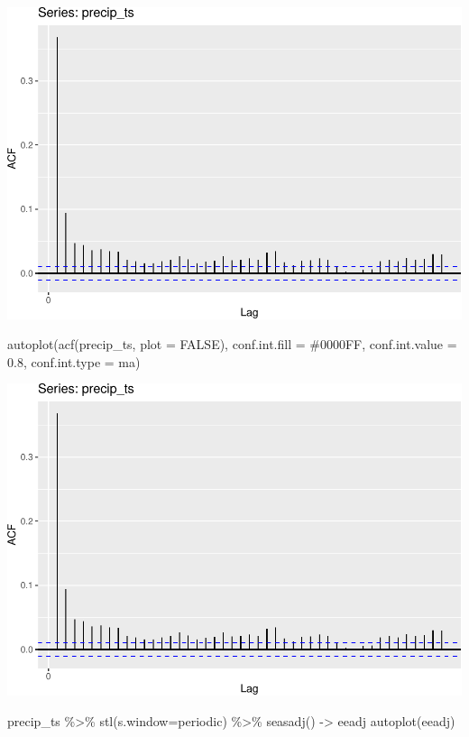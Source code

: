 \documentclass[
  paper=a4,
  ,captions=tableheading
]{scrartcl}
\newenvironment{Shaded}{\begin{snugshade}}{\end{snugshade}}
\newcommand{\AttributeTok}[1]{\textcolor[rgb]{0.77,0.63,0.00}{#1}}
\newcommand{\ConstantTok}[1]{\textcolor[rgb]{0.00,0.00,0.00}{#1}}
\newcommand{\FloatTok}[1]{\textcolor[rgb]{0.00,0.00,0.81}{#1}}
\newcommand{\FunctionTok}[1]{\textcolor[rgb]{0.00,0.00,0.00}{#1}}
\newcommand{\NormalTok}[1]{#1}
\newcommand{\OtherTok}[1]{\textcolor[rgb]{0.56,0.35,0.01}{#1}}
\newcommand{\SpecialCharTok}[1]{\textcolor[rgb]{0.00,0.00,0.00}{#1}}
\newcommand{\StringTok}[1]{\textcolor[rgb]{0.31,0.60,0.02}{#1}}
\begin{document}
\includegraphics{Haskell_files/figure-latex/unnamed-chunk-84-1.pdf}

\begin{Shaded}
\begin{Highlighting}[]
\FunctionTok{autoplot}\NormalTok{(}\FunctionTok{acf}\NormalTok{(precip\_ts, }\AttributeTok{plot =} \ConstantTok{FALSE}\NormalTok{), }\AttributeTok{conf.int.fill =} \StringTok{\textquotesingle{}\#0000FF\textquotesingle{}}\NormalTok{, }\AttributeTok{conf.int.value =} \FloatTok{0.8}\NormalTok{, }\AttributeTok{conf.int.type =} \StringTok{\textquotesingle{}ma\textquotesingle{}}\NormalTok{)}
\end{Highlighting}
\end{Shaded}

\includegraphics{Haskell_files/figure-latex/unnamed-chunk-85-1.pdf}

\begin{Shaded}
\begin{Highlighting}[]
\NormalTok{precip\_ts }\SpecialCharTok{\%\textgreater{}\%} \FunctionTok{stl}\NormalTok{(}\AttributeTok{s.window=}\StringTok{\textquotesingle{}periodic\textquotesingle{}}\NormalTok{) }\SpecialCharTok{\%\textgreater{}\%} \FunctionTok{seasadj}\NormalTok{() }\OtherTok{{-}\textgreater{}}\NormalTok{ eeadj}
\FunctionTok{autoplot}\NormalTok{(eeadj)}
\end{Highlighting}
\end{Shaded}
\end{document}
